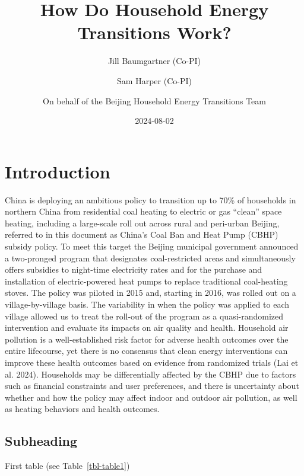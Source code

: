 \documentclass[
  letterpaper,
  DIV=11,
  numbers=noendperiod]{scrartcl}
\title{How Do Household Energy Transitions Work?}
\author{Jill Baumgartner (Co-PI) \and Sam Harper (Co-PI) \and On behalf
of the Beijing Household Energy Transitions Team}
\date{2024-08-02}
\renewcommand*\contentsname{Table of contents}
\newcommand\contentsname{Table of contents}
\begin{document}
\maketitle

\renewcommand*\contentsname{Table of contents}
{
\hypersetup{linkcolor=}
\setcounter{tocdepth}{3}
\tableofcontents
}

\newpage

\section{Introduction}\label{introduction}

China is deploying an ambitious policy to transition up to 70\% of
households in northern China from residential coal heating to electric
or gas ``clean'' space heating, including a large-scale roll out across
rural and peri-urban Beijing, referred to in this document as China's
Coal Ban and Heat Pump (CBHP) subsidy policy. To meet this target the
Beijing municipal government announced a two-pronged program that
designates coal-restricted areas and simultaneously offers subsidies to
night-time electricity rates and for the purchase and installation of
electric-powered heat pumps to replace traditional coal-heating stoves.
The policy was piloted in 2015 and, starting in 2016, was rolled out on
a village-by-village basis. The variability in when the policy was
applied to each village allowed us to treat the roll-out of the program
as a quasi-randomized intervention and evaluate its impacts on air
quality and health. Household air pollution is a well-established risk
factor for adverse health outcomes over the entire lifecourse, yet there
is no consensus that clean energy interventions can improve these health
outcomes based on evidence from randomized trials (Lai et al. 2024).
Households may be differentially affected by the CBHP due to factors
such as financial constraints and user preferences, and there is
uncertainty about whether and how the policy may affect indoor and
outdoor air pollution, as well as heating behaviors and health outcomes.

\subsection{Subheading}\label{subheading}

First table (see Table~\ref{tbl-table1})
\end{document}
